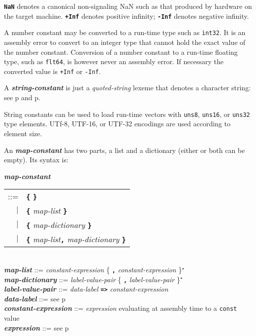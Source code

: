 \documentclass[12pt]{article}
\newcommand{\TT}[1]{{\tt \bfseries #1}}
\newcommand{\STAR}{{\Large $^\star$}}
\newcommand{\emkey}[1]{{\em \bfseries #1}}
\newcommand{\pagref}[1]{p\pageref{#1}}
\newenvironment{indpar}[1][0.3in]%
	{\begin{list}{}%
		     {\setlength{\itemsep}{0in}%
		      \setlength{\topsep}{0in}%
		      \setlength{\parsep}{1ex}%
		      \setlength{\labelwidth}{#1}%
		      \setlength{\leftmargin}{#1}%
		      \addtolength{\leftmargin}{\labelsep}}%
	 \item}%
	{\end{list}}
\begin{document}
\TT{NaN} denotes a canonical non-signaling NaN such
as that produced by hardware on the target machine.
\TT{+Inf} denotes positive infinity; \TT{-Inf} denotes negative infinity.

A number constant may be converted to a run-time type such as {\tt int32}.
It is an assembly error to convert to an integer type that cannot
hold the exact value of the number constant.
Conversion of a number constant
to a run-time floating type, such as {\tt flt64}, is however
never an assembly error.  If necessary the converted value is
{\tt +Inf} or {\tt -Inf}.

A \emkey{string-constant} is just a {\em quoted-string} lexeme
that denotes a character string: see
\pagref{QUOTED-STRING} and \pagref{QUOTED-STRING-CONCATENATION}.

String constants can be used to load run-time vectors
with {\tt uns8}, {\tt uns16}, or {\tt uns32} type elements.
UTf-8, UTF-16, or UTF-32 encodings are used according to element
size.

An \emkey{map-constant} has two parts, a list and a dictionary
(either or both can be empty).  Its syntax is:

\begin{indpar}
\emkey{map-constant}
    \begin{tabular}[t]{rl}
    ::= & \TT{\{} \TT{\}} \\
    $|$ & \TT{\{} {\em map-list} \TT{\}} \\
    $|$ & \TT{\{} {\em map-dictionary} \TT{\}} \\
    $|$ & \TT{\{} {\em map-list}\TT{,} {\em map-dictionary} \TT{\}} \\
    \end{tabular}
\\[0.5ex]
\emkey{map-list} ::= {\em constant-expression}
                     \{ \TT{,} {\em constant-expression} \}\STAR{}
\\[0.5ex]
\emkey{map-dictionary} ::= {\em label-value-pair}
                              \{ \TT{,} {\em label-value-pair} \}\STAR{}
\\[0.5ex]
\emkey{label-value-pair} ::=
    {\em data-label} \TT{=>} {\em constant-expression}
\\[0.5ex]
\emkey{data-label} ::= see \pagref{DATA-LABEL}
\\[0.5ex]
\emkey{constant-expression} ::= {\em expression} evaluating at assembly time to a {\tt const} value
\\[0.5ex]
\emkey{expression} ::= see \pagref{EXPRESSION}
\end{indpar}
\end{document}
